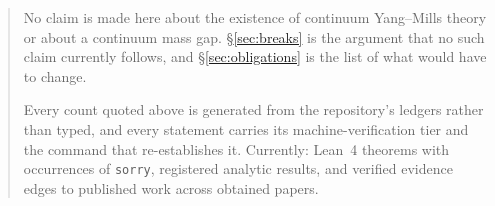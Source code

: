 \begin{abstract}
No claim is made here about the existence of continuum Yang--Mills theory
or about a continuum mass gap. \S\ref{sec:breaks} is the argument that no
such claim currently follows, and \S\ref{sec:obligations} is the list of
what would have to change.

Every count quoted above is generated from the repository's ledgers
rather than typed, and every statement carries its
machine-verification tier and the command that re-establishes it.
Currently: \LeanTotal{} Lean~4 theorems with \LeanSorry{} occurrences of
\texttt{sorry}, \ResTotal{} registered analytic results, and
\LitVerified{} verified evidence edges to published work across
\LitObtained{} obtained papers.
\end{abstract}
